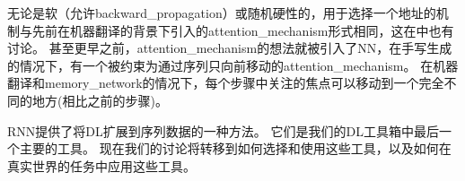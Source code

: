 无论是软（允许\gls{backward_propagation}）或随机硬性的，用于选择一个地址的机制与先前在机器翻译的背景下引入的\gls{attention_mechanism}形式相同\citep{Bahdanau-et-al-2015}，这在中也有讨论。
甚至更早之前，\gls{attention_mechanism}的想法就被引入了\gls{NN}，在手写生成的情况下\citep{Graves-2013}，有一个被约束为通过序列只向前移动的\gls{attention_mechanism}。
在机器翻译和\gls{memory_network}的情况下，每个步骤中关注的焦点可以移动到一个完全不同的地方(相比之前的步骤)。

\gls{RNN}提供了将\gls{DL}扩展到序列数据的一种方法。
它们是我们的\gls{DL}工具箱中最后一个主要的工具。
现在我们的讨论将转移到如何选择和使用这些工具，以及如何在真实世界的任务中应用这些工具。
